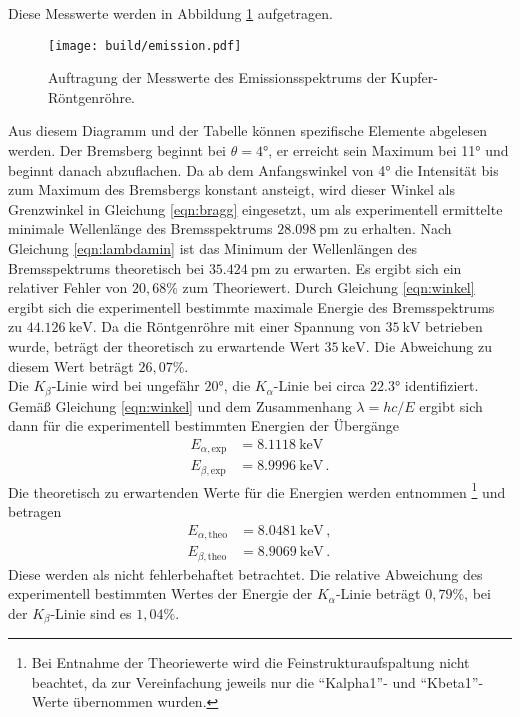 Diese Messwerte werden in Abbildung \ref{fig:emission} aufgetragen.

\begin{figure}
  \centering
  \texttt{[image: build/emission.pdf]}
  \caption{Auftragung der Messwerte des Emissionsspektrums der Kupfer-Röntgenröhre.}
  \label{fig:emission}
\end{figure}

Aus diesem Diagramm und der Tabelle können spezifische Elemente abgelesen werden.
Der Bremsberg beginnt bei $\theta = 4°$, er erreicht sein Maximum bei 11° und beginnt danach abzuflachen.
Da ab dem Anfangswinkel von 4° die Intensität bis zum Maximum des Bremsbergs konstant
ansteigt, wird dieser Winkel als Grenzwinkel in Gleichung \eqref{eqn:bragg} eingesetzt, um als experimentell ermittelte minimale
Wellenlänge des Bremsspektrums $\SI{28.098}{\pico\meter}$ zu erhalten. Nach Gleichung
\eqref{eqn:lambdamin} ist das Minimum der Wellenlängen des Bremsspektrums theoretisch
bei $\SI{35.424}{\pico\meter}$ zu erwarten. Es ergibt sich ein relativer Fehler von
$20{,}68\%$ zum Theoriewert. Durch Gleichung \eqref{eqn:winkel} ergibt sich
die experimentell bestimmte maximale Energie des Bremsspektrums zu $\SI{44.126}{\kilo\electronvolt}$.
Da die Röntgenröhre mit einer Spannung von $\SI{35}{\kilo\volt}$ betrieben wurde,
beträgt der theoretisch zu erwartende Wert $\SI{35}{\kilo\electronvolt}$. Die Abweichung
zu diesem Wert beträgt $26{,}07\%$. \\
Die $K_\beta$-Linie wird bei ungefähr $20°$, die $K_\alpha$-Linie bei circa $22.3°$ identifiziert.
Gemäß Gleichung \eqref{eqn:winkel} und dem Zusammenhang $\lambda = hc/E$ ergibt
sich dann für die experimentell bestimmten Energien der Übergänge
\begin{align*}
  E_{\alpha,\text{exp}} &= \SI{8.1118}{\kilo\electronvolt} \,\\
  E_{\beta,\text{exp}} &= \SI{8.9996}{\kilo\electronvolt} \,.
\end{align*}
Die theoretisch zu erwartenden Werte für die Energien werden \cite{xraydata} entnommen \footnote{
Bei Entnahme der Theoriewerte wird die Feinstrukturaufspaltung nicht beachtet, da zur Vereinfachung
jeweils nur die \enquote{Kalpha1}- und \enquote{Kbeta1}-Werte übernommen wurden.
} und
betragen
\begin{align*}
  E_{\alpha,\text{theo}} &= \SI{8.0481}{\kilo\electronvolt} \,,\\
  E_{\beta,\text{theo}} &= \SI{8.9069}{\kilo\electronvolt} \,.
\end{align*}
Diese werden als nicht fehlerbehaftet betrachtet.
Die relative Abweichung des experimentell bestimmten Wertes der Energie
der $K_\alpha$-Linie beträgt $0{,}79\%$, bei der $K_\beta$-Linie sind es $1{,}04\%$.

